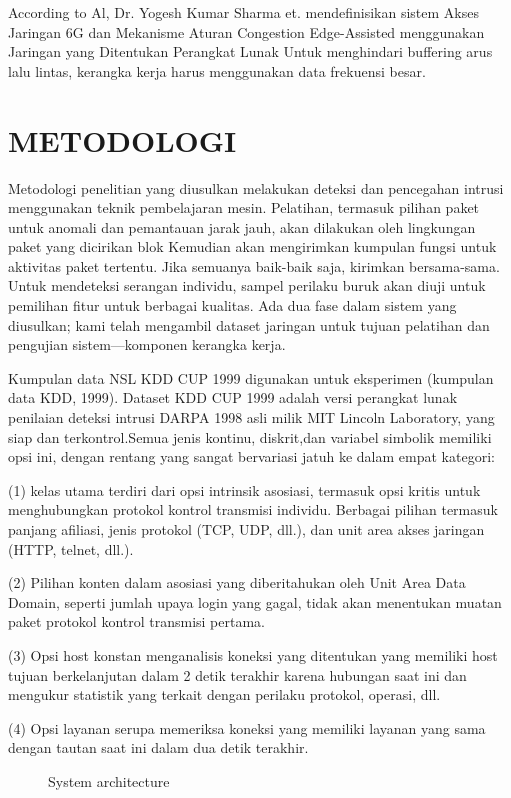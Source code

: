 \documentclass[conference]{IEEEtran}
\begin{document}
{According to Al, Dr. Yogesh Kumar Sharma et. \cite {borole20206g} mendefinisikan sistem Akses Jaringan 6G dan Mekanisme Aturan Congestion Edge-Assisted menggunakan Jaringan yang Ditentukan Perangkat Lunak Untuk menghindari buffering arus lalu lintas, kerangka kerja harus menggunakan data frekuensi besar.

\section{METODOLOGI}
Metodologi penelitian yang diusulkan melakukan deteksi dan pencegahan intrusi menggunakan teknik pembelajaran mesin. Pelatihan, termasuk pilihan paket untuk anomali dan pemantauan jarak jauh, akan dilakukan oleh lingkungan paket yang dicirikan blok Kemudian akan mengirimkan kumpulan fungsi untuk aktivitas paket tertentu. Jika semuanya baik-baik saja, kirimkan bersama-sama. Untuk mendeteksi serangan individu, sampel perilaku buruk akan diuji untuk pemilihan fitur untuk berbagai
kualitas. Ada dua fase dalam sistem yang diusulkan; kami telah mengambil dataset jaringan untuk tujuan pelatihan dan pengujian sistem—komponen kerangka kerja.

Kumpulan data NSL KDD CUP 1999 digunakan untuk eksperimen (kumpulan data KDD, 1999). Dataset KDD CUP 1999 adalah versi perangkat lunak penilaian deteksi intrusi DARPA 1998 asli milik MIT Lincoln Laboratory, yang siap dan terkontrol.Semua jenis kontinu, diskrit,dan variabel simbolik memiliki opsi ini, dengan rentang yang sangat bervariasi jatuh ke dalam empat kategori:

(1) kelas utama terdiri dari opsi intrinsik asosiasi, termasuk opsi kritis untuk menghubungkan protokol kontrol transmisi individu. Berbagai pilihan termasuk panjang afiliasi, jenis protokol (TCP, UDP, dll.), dan unit area akses jaringan (HTTP, telnet, dll.).

(2) Pilihan konten dalam asosiasi yang diberitahukan oleh Unit Area Data Domain, seperti jumlah upaya login yang gagal, tidak akan menentukan muatan paket protokol kontrol transmisi pertama. 

(3) Opsi host konstan menganalisis koneksi yang ditentukan yang memiliki host tujuan berkelanjutan dalam 2 detik terakhir karena hubungan saat ini dan mengukur statistik yang terkait dengan perilaku protokol, operasi, dll.

(4) Opsi layanan serupa memeriksa koneksi yang memiliki layanan yang sama dengan tautan saat ini dalam dua detik terakhir.

\begin{figure}
\centering
\scalebox{0.65}{}
\caption{System architecture}
\end{figure}

}
\end{document}
